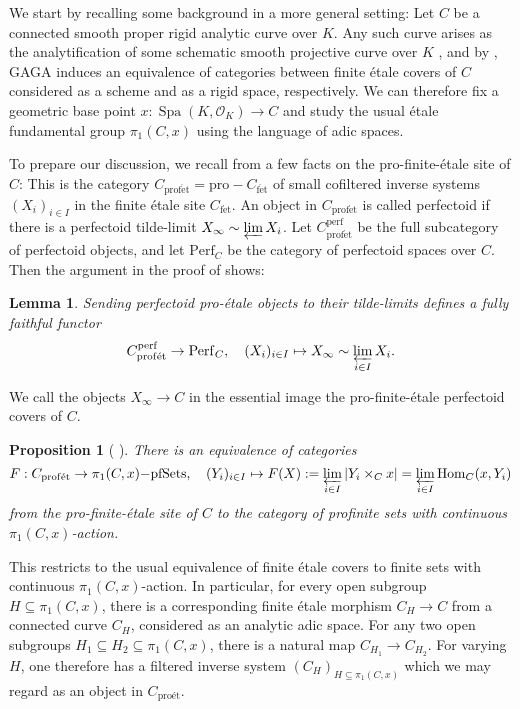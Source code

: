 \documentclass[10pt,oneside]{amsart}
\newtheorem{lemma}[theorem]{Lemma}
\newtheorem{proposition}[theorem]{Proposition}
\theoremstyle{definition}
\newcommand{\Spa}{\operatorname{Spa}}
\newcommand{\Hom}{\operatorname{Hom}}
\newcommand{\perf}{{\operatorname{perf}}}
\newcommand{\fet}{\operatorname{f\acute{e}t}}
\newcommand{\profet}{\operatorname{prof\acute{e}t}}
\renewcommand{\O}{\mathcal{O}}
\begin{document}
	We start by recalling some background in a more general setting: Let $C$ be a connected smooth proper rigid analytic curve over $K$. Any such curve arises as the analytification of some schematic smooth projective curve over $K$ \cite[Theorem 1.8.1]{Lut}, and by \cite[Theorem 3.1]{LutRiemann}, GAGA induces an equivalence of categories between finite \'etale covers of $C$ considered as a scheme and as a rigid  space, respectively. We can therefore fix a geometric base point $x:\Spa({K},\O_{{K}})\to C$ and study the usual \'etale fundamental group $\pi_1(C,x)$ using the language of adic spaces. 
	
	To prepare our discussion, we recall from \cite[\S3]{p-adic_Hodge} a few facts on the pro-finite-\'etale site of $C$: This is the category $C_{\profet}=\mathrm{pro-}C_{\fet}$ of small cofiltered inverse systems $(X_i)_{i\in I}$ in the finite \'etale site $C_{\fet}$. An object in $C_{\profet}$ is called perfectoid if there is a perfectoid tilde-limit $X_\infty\sim \varprojlim X_i$. Let $C_{\profet}^{\perf}$ be the full subcategory of perfectoid objects, and let $\mathrm{Perf}_C$ be the category of perfectoid spaces over $C$. Then the argument in the proof of \cite[Lemma 8.2.3]{berkeley} shows:
\begin{lemma}\label{l:profet-perf-tilde-limit-fully-faithful}
	Sending perfectoid pro-\'etale objects to their tilde-limits defines a fully faithful functor
	\[C_{\profet}^{\perf}\to  \mathrm{Perf}_{C},\quad (X_i)_{i\in I}\mapsto X_\infty\sim \varprojlim_{i\in I} X_i.\]
\end{lemma}
	We call the objects $X_\infty \to C$ in the essential image the pro-finite-\'etale perfectoid covers of $C$.
	\begin{proposition}[{ \cite[Proposition~3.5]{p-adic_Hodge}}]
		There is an equivalence of categories
		\[ F:C_{\mathrm{prof\acute{e}t}}\to \pi_{1}(C,x)\mathrm{-pfSets},\quad (Y_i)_{i\in I} \mapsto F(X):=\varprojlim_{i\in I}|Y_i\times_{C}x|=\varprojlim_{i\in I}\Hom_C(x,Y_i)\]
		from the pro-finite-\'etale site of $C$ to the category of profinite sets with continuous $\pi_{1}(C,x)$-action.
	\end{proposition}
	This restricts to the usual equivalence of finite \'etale covers to finite sets with continuous $\pi_{1}(C,x)$-action. 
	In particular, for every open subgroup $H\subseteq \pi_1(C,x)$, there is a corresponding finite \'etale morphism $C_H\to C$ from a connected curve $C_H$, considered as an analytic adic space. For any two open subgroups $H_1\subseteq H_2\subseteq \pi_1(C,x)$, there is a natural map $C_{H_1}\to C_{H_2}$. For varying $H$, one therefore has a filtered inverse system $(C_H)_{H\subseteq \pi_1(C,x)}$ which we may regard as an object in $C_{\text{pro\'et}}$.
\end{document}
